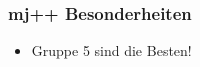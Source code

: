 \begin{frame}
    \frametitle{mj++ Besonderheiten}
    \begin{itemize}
        \item Gruppe 5 sind die Besten!
    \end{itemize}
\end{frame}
